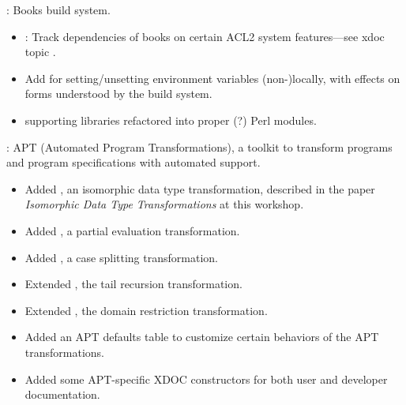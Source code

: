 
\begin{frame}

\implibtitle

:
Books build system.
\begin{itemize}
\item {}: Track dependencies of books on certain ACL2 system features---see xdoc topic .
\item Add  for setting/unsetting environment
  variables (non-)locally, with effects on  forms
  understood by the build system.
\item {} supporting libraries refactored into proper (?) Perl modules.
\end{itemize}

\end{frame}


\begin{frame}

\implibtitle

:
APT (Automated Program Transformations),
a toolkit to transform programs and program specifications
with automated support.
\begin{itemize}
\item
Added , an isomorphic data type transformation,
described in the paper
\textit{Isomorphic Data Type Transformations} at this workshop.
\item
Added , a partial evaluation transformation.
\item
Added , a case splitting transformation.
\item
Extended , the tail recursion transformation.
\item
Extended , the domain restriction transformation.
\item
Added an APT defaults table
to customize certain behaviors of the APT transformations.
\item
Added some APT-specific XDOC constructors
for both user and developer documentation.
\end{itemize}

\end{frame}

